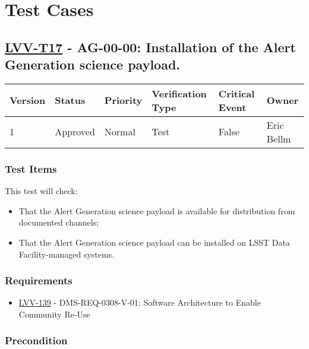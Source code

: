\section{Test Cases}\label{test-cases}

\subsection{\texorpdfstring{\href{https://jira.lsstcorp.org/secure/Tests.jspa\#/testCase/LVV-T17}{LVV-T17}
- AG-00-00: Installation of the Alert Generation science
payload.}{LVV-T17 - AG-00-00: Installation of the Alert Generation science payload.}}\label{lvv-t17---ag-00-00-installation-of-the-alert-generation-science-payload.}

\begin{longtable}[]{@{}llllll@{}}
\toprule
Version & Status & Priority & Verification Type & Critical Event &
Owner\tabularnewline
\midrule
\endhead
1 & Approved & Normal & Test & False & Eric Bellm\tabularnewline
\bottomrule
\end{longtable}

\subsubsection{Test Items}\label{test-items}

This test will check:

\begin{itemize}
\tightlist
\item
  That the Alert Generation science payload is available for
  distribution from documented channels;
\item
  That the Alert Generation science payload can be installed on LSST
  Data Facility-managed systems.
\end{itemize}

\subsubsection{Requirements}\label{requirements}

\begin{itemize}
\tightlist
\item
  \href{https://jira.lsstcorp.org/browse/LVV-139}{LVV-139} -
  DMS-REQ-0308-V-01: Software Architecture to Enable Community Re-Use
\end{itemize}

\subsubsection{Precondition}\label{precondition}

